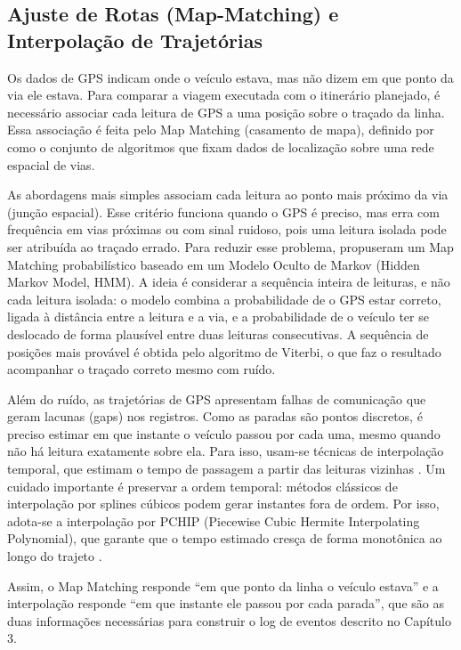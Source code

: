 \subsection{Ajuste de Rotas (Map-Matching) e Interpolação de Trajetórias}\label{subsec:mapmatching}

Os dados de GPS indicam onde o veículo estava, mas não dizem em que ponto da via ele estava. Para comparar a viagem executada com o itinerário planejado, é necessário associar cada leitura de GPS a uma posição sobre o traçado da linha. Essa associação é feita pelo Map Matching (casamento de mapa), definido por  como o conjunto de algoritmos que fixam dados de localização sobre uma rede espacial de vias.

As abordagens mais simples associam cada leitura ao ponto mais próximo da via (junção espacial). Esse critério funciona quando o GPS é preciso, mas erra com frequência em vias próximas ou com sinal ruidoso, pois uma leitura isolada pode ser atribuída ao traçado errado. Para reduzir esse problema,  propuseram um Map Matching probabilístico baseado em um Modelo Oculto de Markov (Hidden Markov Model, HMM). A ideia é considerar a sequência inteira de leituras, e não cada leitura isolada: o modelo combina a probabilidade de o GPS estar correto, ligada à distância entre a leitura e a via, e a probabilidade de o veículo ter se deslocado de forma plausível entre duas leituras consecutivas. A sequência de posições mais provável é obtida pelo algoritmo de Viterbi, o que faz o resultado acompanhar o traçado correto mesmo com ruído.

Além do ruído, as trajetórias de GPS apresentam falhas de comunicação que geram lacunas (gaps) nos registros. Como as paradas são pontos discretos, é preciso estimar em que instante o veículo passou por cada uma, mesmo quando não há leitura exatamente sobre ela. Para isso, usam-se técnicas de interpolação temporal, que estimam o tempo de passagem a partir das leituras vizinhas \cite{borges2023}. Um cuidado importante é preservar a ordem temporal: métodos clássicos de interpolação por splines cúbicos podem gerar instantes fora de ordem. Por isso, adota-se a interpolação por PCHIP (Piecewise Cubic Hermite Interpolating Polynomial), que garante que o tempo estimado cresça de forma monotônica ao longo do trajeto \cite{fritsch1980}.

Assim, o Map Matching responde ``em que ponto da linha o veículo estava'' e a interpolação responde ``em que instante ele passou por cada parada'', que são as duas informações necessárias para construir o log de eventos descrito no Capítulo 3.

